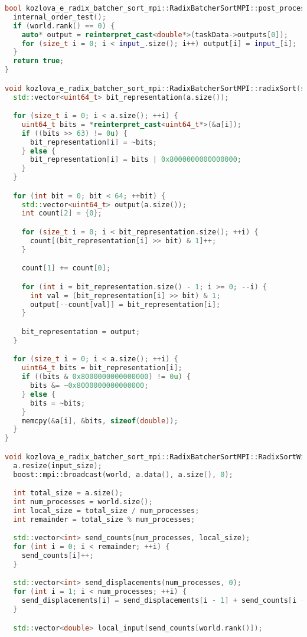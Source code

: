 \documentclass[a4paper,12pt]{article}
\begin{document}
\begin{lstlisting}[language=C++,caption={Код программы}]
bool kozlova_e_radix_batcher_sort_mpi::RadixBatcherSortMPI::post_processing() {
  internal_order_test();
  if (world.rank() == 0) {
    auto* output = reinterpret_cast<double*>(taskData->outputs[0]);
    for (size_t i = 0; i < input_.size(); i++) output[i] = input_[i];
  }
  return true;
}

void kozlova_e_radix_batcher_sort_mpi::RadixBatcherSortMPI::radixSort(std::vector<double>& a) {
  std::vector<uint64_t> bit_representation(a.size());

  for (size_t i = 0; i < a.size(); ++i) {
    uint64_t bits = *reinterpret_cast<uint64_t*>(&a[i]);
    if ((bits >> 63) != 0u) {
      bit_representation[i] = ~bits;
    } else {
      bit_representation[i] = bits | 0x8000000000000000;
    }
  }

  for (int bit = 0; bit < 64; ++bit) {
    std::vector<uint64_t> output(a.size());
    int count[2] = {0};

    for (size_t i = 0; i < bit_representation.size(); ++i) {
      count[(bit_representation[i] >> bit) & 1]++;
    }

    count[1] += count[0];

    for (int i = bit_representation.size() - 1; i >= 0; --i) {
      int val = (bit_representation[i] >> bit) & 1;
      output[--count[val]] = bit_representation[i];
    }

    bit_representation = output;
  }

  for (size_t i = 0; i < a.size(); ++i) {
    uint64_t bits = bit_representation[i];
    if ((bits & 0x8000000000000000) != 0u) {
      bits &= ~0x8000000000000000;
    } else {
      bits = ~bits;
    }
    memcpy(&a[i], &bits, sizeof(double));
  }
}

void kozlova_e_radix_batcher_sort_mpi::RadixBatcherSortMPI::RadixSortWithOddEvenMerge(std::vector<double>& a) {
  a.resize(input_size);
  boost::mpi::broadcast(world, a.data(), a.size(), 0);

  int total_size = a.size();
  int num_processes = world.size();
  int local_size = total_size / num_processes;
  int remainder = total_size % num_processes;

  std::vector<int> send_counts(num_processes, local_size);
  for (int i = 0; i < remainder; ++i) {
    send_counts[i]++;
  }

  std::vector<int> send_displacements(num_processes, 0);
  for (int i = 1; i < num_processes; ++i) {
    send_displacements[i] = send_displacements[i - 1] + send_counts[i - 1];
  }

  std::vector<double> local_input(send_counts[world.rank()]);


\end{lstlisting}
\end{document}
